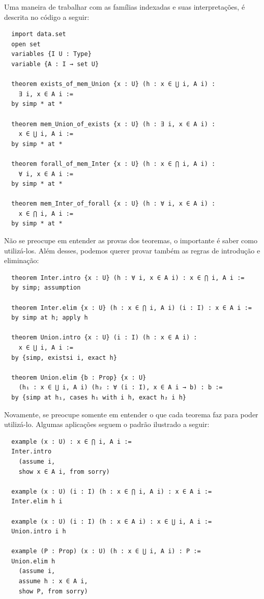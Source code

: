 Uma maneira de trabalhar com as famílias indexadas e suas interpretações, é descrita no código a seguir:

\begin{lstlisting}
  import data.set
  open set
  variables {I U : Type}
  variable {A : I → set U}

  theorem exists_of_mem_Union {x : U} (h : x ∈ ⋃ i, A i) :
    ∃ i, x ∈ A i :=
  by simp * at *

  theorem mem_Union_of_exists {x : U} (h : ∃ i, x ∈ A i) :
    x ∈ ⋃ i, A i :=
  by simp * at *

  theorem forall_of_mem_Inter {x : U} (h : x ∈ ⋂ i, A i) :
    ∀ i, x ∈ A i :=
  by simp * at *

  theorem mem_Inter_of_forall {x : U} (h : ∀ i, x ∈ A i) :
    x ∈ ⋂ i, A i :=
  by simp * at *
\end{lstlisting}

Não se preocupe em entender as provas dos teoremas, o importante é saber como utilizá-los. Além desses, podemos querer provar também as regras de introdução e eliminação:

\begin{lstlisting}
  theorem Inter.intro {x : U} (h : ∀ i, x ∈ A i) : x ∈ ⋂ i, A i :=
  by simp; assumption

  theorem Inter.elim {x : U} (h : x ∈ ⋂ i, A i) (i : I) : x ∈ A i :=
  by simp at h; apply h

  theorem Union.intro {x : U} (i : I) (h : x ∈ A i) :
    x ∈ ⋃ i, A i :=
  by {simp, existsi i, exact h}

  theorem Union.elim {b : Prop} {x : U}
    (h₁ : x ∈ ⋃ i, A i) (h₂ : ∀ (i : I), x ∈ A i → b) : b :=
  by {simp at h₁, cases h₁ with i h, exact h₂ i h}
\end{lstlisting}

Novamente, se preocupe somente em entender o que cada teorema faz para poder utilizá-lo. Algumas aplicações seguem o padrão ilustrado a seguir:

\begin{lstlisting}
  example (x : U) : x ∈ ⋂ i, A i :=
  Inter.intro
    (assume i,
    show x ∈ A i, from sorry)

  example (x : U) (i : I) (h : x ∈ ⋂ i, A i) : x ∈ A i :=
  Inter.elim h i

  example (x : U) (i : I) (h : x ∈ A i) : x ∈ ⋃ i, A i :=
  Union.intro i h

  example (P : Prop) (x : U) (h : x ∈ ⋃ i, A i) : P :=
  Union.elim h
    (assume i,
    assume h : x ∈ A i,
    show P, from sorry)
\end{lstlisting}

